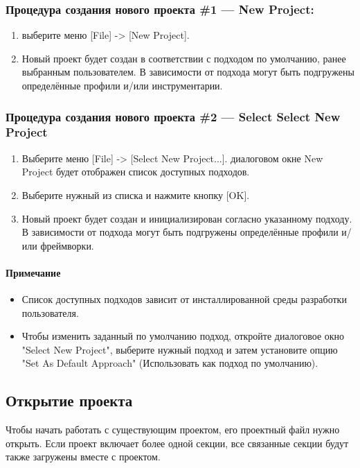 \documentclass[a4paper,12pt]{report}
\begin{document}
\subsubsection*{Процедура создания нового проекта \#1 --- New Project:}
\begin{enumerate}
	\item выберите меню [File] -> [New Project].
	\item Новый проект будет создан в соответствии с подходом по умолчанию, ранее выбранным
	пользователем. В зависимости от подхода могут быть подгружены определённые профили
	и/или инструментарии.
\end{enumerate}
 
\subsubsection*{Процедура создания нового проекта \#2 --- Select Select New Project}
\begin{enumerate}
	\item Выберите меню [File] -> [Select New Project...].
	диалоговом окне New Project будет отображен список доступных подходов.
	\item Выберите	нужный из списка и нажмите кнопку [OK].
	\item Новый проект будет создан и инициализирован согласно указанному подходу. В
	зависимости от подхода могут быть подгружены определённые профили и/или фреймворки.
\end{enumerate}

\paragraph{Примечание}
\begin{itemize}
	\item Список доступных подходов зависит от инсталлированной среды разработки пользователя.
	\item Чтобы изменить заданный по умолчанию подход, откройте диалоговое окно "Select New
	Project", выберите нужный подход и затем установите опцию "Set As Default Approach"
	(Использовать как подход по умолчанию).
\end{itemize}

\subsection*{Открытие проекта}
Чтобы начать работать с существующим проектом, его проектный файл нужно открыть. Если
проект включает более одной секции, все связанные секции будут также загружены вместе с
проектом.
\end{document}
